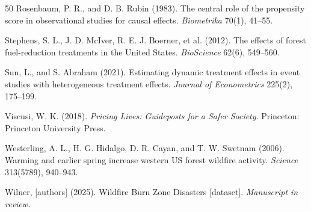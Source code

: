 \documentclass[12pt, letterpaper]{article}
\begin{document}
\begin{thebibliography}{50}
Rosenbaum, P. R., and D. B. Rubin (1983). The central role of the propensity score in observational studies for causal effects. \textit{Biometrika} 70(1), 41--55.

Stephens, S. L., J. D. McIver, R. E. J. Boerner, et al. (2012). The effects of forest fuel-reduction treatments in the United States. \textit{BioScience} 62(6), 549--560.

Sun, L., and S. Abraham (2021). Estimating dynamic treatment effects in event studies with heterogeneous treatment effects. \textit{Journal of Econometrics} 225(2), 175--199.

Viscusi, W. K. (2018). \textit{Pricing Lives: Guideposts for a Safer Society}. Princeton: Princeton University Press.

Westerling, A. L., H. G. Hidalgo, D. R. Cayan, and T. W. Swetnam (2006). Warming and earlier spring increase western US forest wildfire activity. \textit{Science} 313(5789), 940--943.

Wilner, [authors] (2025). Wildfire Burn Zone Disasters [dataset]. \textit{Manuscript in review.}

\end{thebibliography}
\end{document}
